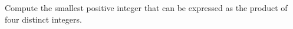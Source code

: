 Compute the smallest positive integer that can be expressed as the product of four distinct integers.
